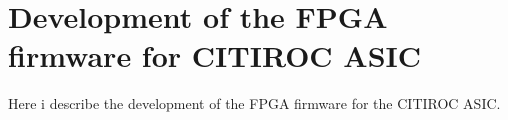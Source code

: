 \chapter{Development of the FPGA firmware for CITIROC ASIC}\label{cha:development}
Here i describe the development of the FPGA firmware for the CITIROC ASIC.